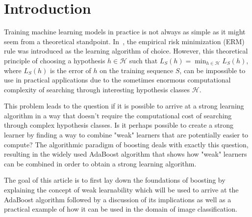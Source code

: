\section{Introduction}

Training machine learning models in practice is not always as simple as it might seem from a theoretical standpoint.
In~\cite[chapter 2]{SSBD14}, the empirical risk minimization (ERM) rule was introduced as the learning algorithm
of choice.
However, this theoretical principle of choosing a hypothesis \mbox{$h \in \mathcal{H}$} such that
$L_S(h) = \min_{h \in \mathcal{H}} L_S(h)$, where $L_S(h)$ is the error of $h$ on the training sequence $S$,
can be impossible to use in practical applications due to the sometimes enormous computational complexity of searching
through interesting hypothesis classes $\mathcal{H}$.

This problem leads to the question if it is possible to arrive at a strong learning algorithm in a way that doesn't require the
computational cost of searching through complex hypothesis classes.
Is it perhaps possible to create a strong learner by finding a way to combine "weak" learners that are potentially easier to compute?
The algorithmic paradigm of boosting deals with exactly this question, resulting in the widely used AdaBoost algorithm that
shows how "weak" learners can be combined in order to obtain a strong learning algorithm.

The goal of this article is to first lay down the foundations of boosting by explaining the concept of weak learnability which
will be used to arrive at the AdaBoost algorithm followed by a discussion of its implications as well as a practical example of how it
can be used in the domain of image classification.
